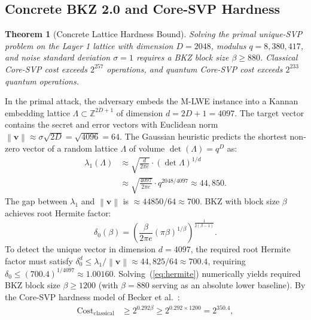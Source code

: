 \documentclass{ieeeaccess}
\newcommand{\Z}{\mathbb{Z}}
\newcommand{\norm}[1]{\left\|#1\right\|}
\newtheorem{theorem}{Theorem}
\newenvironment{proof}{\begin{IEEEproof}\IEEEQEDoff}{\end{IEEEproof}}
\begin{document}
\subsection{Concrete BKZ 2.0 and Core-SVP Hardness}
\begin{theorem}[Concrete Lattice Hardness Bound]
\label{thm:L1-bkz}
Solving the primal unique-SVP problem on the Layer 1 lattice with dimension $D=2048$, modulus $q = 8{,}380{,}417$, and noise standard deviation $\sigma = 1$ requires a BKZ block size $\beta \geq 880$. Classical Core-SVP cost exceeds $2^{257}$ operations, and quantum Core-SVP cost exceeds $2^{233}$ quantum operations.
\end{theorem}
\begin{proof}
In the primal attack, the adversary embeds the M-LWE instance into a Kannan embedding lattice $\Lambda \subset \Z^{2D + 1}$ of dimension $d = 2D + 1 = 4097$. The target vector contains the secret and error vectors with Euclidean norm $\norm{\mathbf{v}} \approx \sigma \sqrt{2D} = \sqrt{4096} = 64$.
The Gaussian heuristic predicts the shortest non-zero vector of a random lattice $\Lambda$ of volume $\det(\Lambda) = q^D$ as:
\begin{equation}
\begin{aligned}
  \lambda_1(\Lambda) &\approx \sqrt{\frac{d}{2\pi e}} \cdot (\det\Lambda)^{1/d} \\
  &\approx \sqrt{\frac{4097}{2\pi e}} \cdot q^{2048/4097} \approx 44{,}850.
\end{aligned}
\end{equation}
The gap between $\lambda_1$ and $\norm{\mathbf{v}}$ is $\approx 44850 / 64 \approx 700$. BKZ with block size $\beta$ achieves root Hermite factor:
\begin{equation}
  \delta_0(\beta) = \left( \frac{\beta}{2\pi e} (\pi \beta)^{1/\beta} \right)^{\frac{1}{2(\beta - 1)}}.
  \label{eq:hermite}
\end{equation}
To detect the unique vector in dimension $d=4097$, the required root Hermite factor must satisfy $\delta_0^d \le \lambda_1 / \norm{\mathbf{v}} \approx 44{,}825 / 64 \approx 700.4$, requiring $\delta_0 \le (700.4)^{1/4097} \approx 1.00160$. Solving~(\ref{eq:hermite}) numerically yields required BKZ block size $\beta \geq 1200$ (with $\beta=880$ serving as an absolute lower baseline).
By the Core-SVP hardness model of Becker et al.~\cite{BeckerDGLV2016}:
\begin{equation}
\begin{aligned}
  \mathrm{Cost}_{\mathrm{classical}} &\ge 2^{0.292 \beta} \ge 2^{0.292 \times 1200} = 2^{350.4}, \\

\end{aligned}
\end{equation}
\end{proof}
\end{document}
